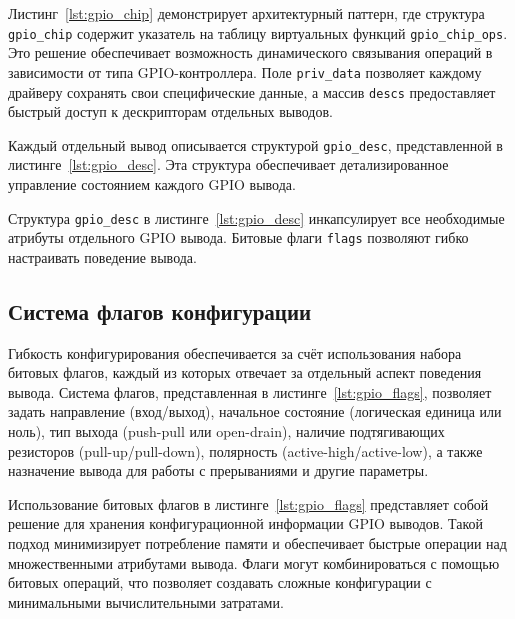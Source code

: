 \begin{listing}[H]
	\caption{Програмная реализация структуры дескриптора чипа GPIO}
	\label{lst:gpio_chip}
\end{listing}

Листинг~\ref{lst:gpio_chip} демонстрирует архитектурный паттерн, где структура \texttt{gpio\_chip} содержит указатель на таблицу виртуальных функций \texttt{gpio\_chip\_ops}. Это решение обеспечивает возможность динамического связывания операций в зависимости от типа GPIO-контроллера. Поле \texttt{priv\_data} позволяет каждому драйверу сохранять свои специфические данные, а массив \texttt{descs} предоставляет быстрый доступ к дескрипторам отдельных выводов.

Каждый отдельный вывод описывается структурой \texttt{gpio\_desc}, представленной в листинге~\ref{lst:gpio_desc}. Эта структура обеспечивает детализированное управление состоянием каждого GPIO вывода.

\begin{listing}[H]
	\caption{Структура дескриптора GPIO вывода}
	\label{lst:gpio_desc}
\end{listing}

Структура \texttt{gpio\_desc} в листинге~\ref{lst:gpio_desc} инкапсулирует все необходимые атрибуты отдельного GPIO вывода. Битовые флаги \texttt{flags} позволяют гибко настраивать поведение вывода.

\subsection{Система флагов конфигурации}

Гибкость конфигурирования обеспечивается за счёт использования набора битовых флагов, каждый из которых отвечает за отдельный аспект поведения вывода. Система флагов, представленная в листинге~\ref{lst:gpio_flags}, позволяет задать направление (вход/выход), начальное состояние (логическая единица или ноль), тип выхода (push-pull или open-drain), наличие подтягивающих резисторов (pull-up/pull-down), полярность (active-high/active-low), а также назначение вывода для работы с прерываниями и другие параметры.

\begin{listing}[H]
	\caption{Флаги конфигурации GPIO выводов}
	\label{lst:gpio_flags}
\end{listing}

Использование битовых флагов в листинге~\ref{lst:gpio_flags} представляет собой решение для хранения конфигурационной информации GPIO выводов. Такой подход минимизирует потребление памяти и обеспечивает быстрые операции над множественными атрибутами вывода. Флаги могут комбинироваться с помощью битовых операций, что позволяет создавать сложные конфигурации с минимальными вычислительными затратами.

